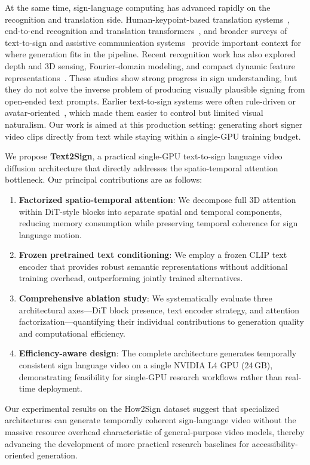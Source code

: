 \documentclass{ieeeaccess}
\begin{document}
{\color{blue}%
At the same time, sign-language computing has advanced rapidly on the recognition and translation side. Human-keypoint-based translation systems~\cite{ko2019neural}, end-to-end recognition and translation transformers~\cite{maia2025mediapipe}, and broader surveys of text-to-sign and assistive communication systems~\cite{kahlon2023systematic,rodriguez2023assistive} provide important context for where generation fits in the pipeline. Recent recognition work has also explored depth and 3D sensing, Fourier-domain modeling, and compact dynamic feature representations~\cite{abdullahi2023idfsign,abdullahi2024fsign,abdullahi2024fourier3d,abdullahi2022prosodic,abdullahi2025redundancy}. These studies show strong progress in sign understanding, but they do not solve the inverse problem of producing visually plausible signing from open-ended text prompts. Earlier text-to-sign systems were often rule-driven or avatar-oriented~\cite{filhol2016rule}, which made them easier to control but limited visual naturalism. Our work is aimed at this production setting: generating short signer video clips directly from text while staying within a single-GPU training budget.
}

{\color{blue}%
We propose \textbf{Text2Sign}, a practical single-GPU text-to-sign language video diffusion architecture that directly addresses the spatio-temporal attention bottleneck. Our principal contributions are as follows:
\begin{enumerate}
    \item \textbf{Factorized spatio-temporal attention}: We decompose full 3D attention within DiT-style blocks into separate spatial and temporal components, reducing memory consumption while preserving temporal coherence for sign language motion.
    \item \textbf{Frozen pretrained text conditioning}: We employ a frozen CLIP text encoder that provides robust semantic representations without additional training overhead, outperforming jointly trained alternatives.
    \item \textbf{Comprehensive ablation study}: We systematically evaluate three architectural axes---DiT block presence, text encoder strategy, and attention factorization---quantifying their individual contributions to generation quality and computational efficiency.
    \item \textbf{Efficiency-aware design}: The complete architecture generates temporally consistent sign language video on a single NVIDIA L4 GPU (24\,GB), demonstrating feasibility for single-GPU research workflows rather than real-time deployment.
\end{enumerate}

Our experimental results on the How2Sign dataset suggest that specialized architectures can generate temporally coherent sign-language video without the massive resource overhead characteristic of general-purpose video models, thereby advancing the development of more practical research baselines for accessibility-oriented generation.
}
\end{document}
